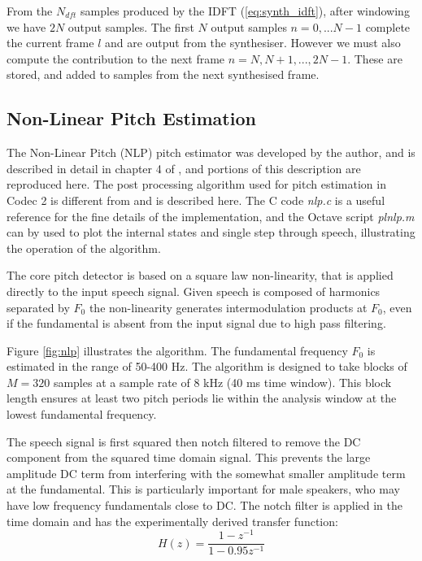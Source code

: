 \documentclass{article}
\begin{document}
From the $N_{dft}$ samples produced by the IDFT (\ref{eq:synth_idft}), after windowing we have $2N$ output samples. The first $N$ output samples $n=0,...N-1$ complete the current frame $l$ and are output from the synthesiser.  However we must also compute the contribution to the next frame $n = N,N+1,...,2N-1$.  These are stored, and added to samples from the next synthesised frame.

\subsection{Non-Linear Pitch Estimation}
\label{sect:nlp}

The Non-Linear Pitch (NLP) pitch estimator was developed by the author, and is described in detail in chapter 4 of \cite{rowe1997techniques}, and portions of this description are reproduced here.  The post processing algorithm used for pitch estimation in Codec 2 is different from \cite{rowe1997techniques} and is described here.  The C code \emph{nlp.c} is a useful reference for the fine details of the implementation, and the Octave script \emph{plnlp.m} can by used to plot the internal states and single step through speech, illustrating the operation of the algorithm.

The core pitch detector is based on a square law non-linearity, that is applied directly to the input speech signal. Given speech is composed of harmonics separated by $F_0$ the non-linearity generates intermodulation products at $F_0$, even if the fundamental is absent from the input signal due to high pass filtering.

Figure \ref{fig:nlp} illustrates the algorithm. The fundamental frequency $F_0$ is estimated in the range of 50-400 Hz. The algorithm is designed to take blocks of $M = 320$ samples at a sample rate of 8 kHz (40 ms time window). This block length ensures at least two pitch periods lie within the analysis window at the lowest fundamental frequency.

The speech signal is first squared then notch filtered to remove the DC component from the squared time domain signal. This prevents the large amplitude DC term from interfering with the somewhat smaller amplitude term at the fundamental. This is particularly important for male speakers, who may have low frequency fundamentals close to DC. The notch filter is applied in the time domain and has the experimentally derived transfer function:
\begin{equation}
H(z) = \frac{1-z^{-1}}{1-0.95z^{-1}}
\end{equation}
\end{document}
